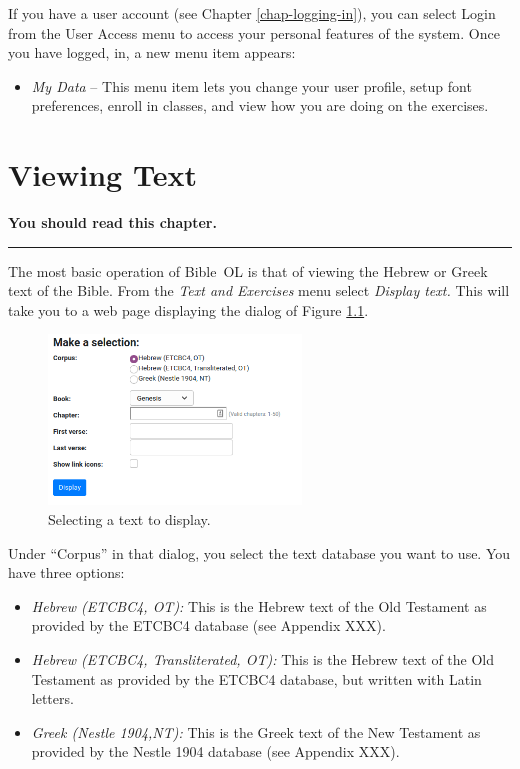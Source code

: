 \documentclass[11pt,oneside,a4paper]{memoir}
\begin{document}
If you have a user account (see Chapter \ref{chap-logging-in}), you can select Login from the User Access menu to
access your personal features of the system. Once you have logged, in, a new menu item appears:

\begin{itemize}
\item \emph{My Data} -- This menu item lets you change your user profile, setup font preferences, enroll in
  classes, and view how you are doing on the exercises.
\end{itemize}


\chapter{Viewing Text}\label{chap-viewing-text}

\textbf{You should read this chapter.}
\plainbreak{3}

The most basic operation of Bible~OL is that of viewing the Hebrew or Greek text of the Bible.
From the \emph{Text and Exercises} menu select \emph{Display text.} This will take you to a web page
displaying the dialog of Figure \ref{fig-selecttext}.
\begin{figure}
  \begin{center}
    \includegraphics[width=0.6\textwidth]{selecttext.png}
  \end{center}
  \caption{Selecting a text to display.}\label{fig-selecttext}
\end{figure}
Under ``Corpus'' in that dialog, you select the text database you want to use. You have three options:


\begin{itemize}
\item \emph{Hebrew (ETCBC4, OT):} This is the Hebrew text of the Old Testament as provided by the ETCBC4
  database (see Appendix XXX).
\item \emph{Hebrew (ETCBC4, Transliterated, OT):} This is the Hebrew text of the Old Testament as provided by
  the ETCBC4 database, but written with Latin letters.
\item \emph{Greek (Nestle 1904,NT):} This is the Greek text of the New Testament as provided by the Nestle
  1904 database (see Appendix XXX).
\end{itemize}
\end{document}
